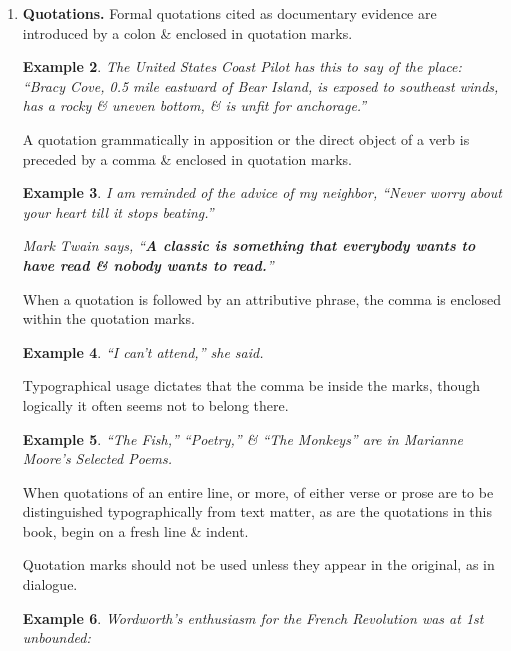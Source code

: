 \documentclass{article}
\newtheorem{example}{Example}
\begin{document}
\begin{enumerate}
	The expression within the marks is punctuated as if it stood by itself, except that the final stop is omitted unless it is question mark or an exclamation point.
	\begin{example}
		I went to her house yesterday (my 3rd attempt to see her), but she had left town.
		
		He declares (and why should we doubt his good faith?) that he is now certain of success.
	\end{example}
	(When a wholly detached expression or sentence is parenthesized, the final stop comes before the last mark of parenthesis.)
	\item {\bf Quotations.} Formal quotations cited as documentary evidence are introduced by a colon \& enclosed in quotation marks.
	\begin{example}
		The United States Coast Pilot has this to say of the place: ``Bracy Cove, 0.5 mile eastward of Bear Island, is exposed to southeast winds, has a rocky \& uneven bottom, \& is unfit for anchorage.''
	\end{example}
	A quotation grammatically in apposition or the direct object of a verb is preceded by a comma \& enclosed in quotation marks.
	\begin{example}
		I am reminded of the advice of my neighbor, ``Never worry about your heart till it stops beating.''
		
		Mark Twain says, ``{\bf A classic is something that everybody wants to have read \& nobody wants to read.}''
	\end{example}
	When a quotation is followed by an attributive phrase, the comma is enclosed within the quotation marks.
	\begin{example}
		``I can't attend,'' she said.
	\end{example}
	Typographical usage dictates that the comma be inside the marks, though logically it often seems not to belong there.
	\begin{example}
		``The Fish,'' ``Poetry,'' \& ``The Monkeys'' are in Marianne Moore's Selected Poems.
	\end{example}
	When quotations of an entire line, or more, of either verse or prose are to be distinguished typographically from text matter, as are the quotations in this book, begin on a fresh line \& indent.
	
	Quotation marks should not be used unless they appear in the original, as in dialogue.
	\begin{example}
		Wordworth's enthusiasm for the French Revolution was at 1st unbounded:
		

\end{example}
\end{enumerate}
\end{document}
